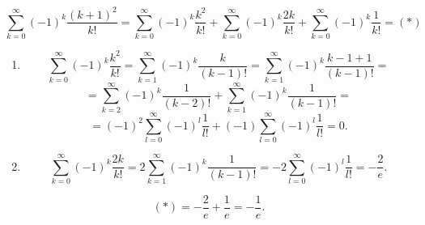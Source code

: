 \documentclass{article}
\begin{document}
$$\sum\limits_{k=0}^\infty (-1)^k \frac{(k+1)^2}{k!}=\sum\limits_{k=0}^\infty(-1)^k\frac{k^2}{k!}+\sum\limits_{k=0}^\infty (-1)^k\frac{2k}{k!}+\sum\limits_{k=0}^\infty(-1)^k \frac{1}{k!}=(*)$$

\begin{enumerate}[label=\alph*)]

\item

$$\sum\limits_{k=0}^\infty(-1)^k\frac{k^2}{k!}=\sum\limits_{k=1}^\infty(-1)^k\frac{k}{(k-1)!}=\sum\limits_{k=1}^\infty(-1)^k\frac{k-1+1}{(k-1)!}=$$
$$=\sum\limits_{k=2}^\infty(-1)^k\frac{1}{(k-2)!}+\sum\limits_{k=1}^\infty(-1)^k\frac{1}{(k-1)!}=$$
$$=(-1)^2\sum\limits_{l=0}^\infty(-1)^l\frac{1}{l!}+(-1)\sum\limits_{l=0}^\infty(-1)^l\frac{1}{l!}=0.$$

\item

$$\sum\limits_{k=0}^\infty (-1)^k\frac{2k}{k!}=2\sum\limits_{k=1}^\infty (-1)^k\frac{1}{(k-1)!}=-2\sum\limits_{l=0}^\infty (-1)^l\frac{1}{l!}=-\frac{2}{e}.$$

\end{enumerate}

$$(*)=-\frac{2}{e}+\frac{1}{e}=-\frac{1}{e}.$$
\end{document}
